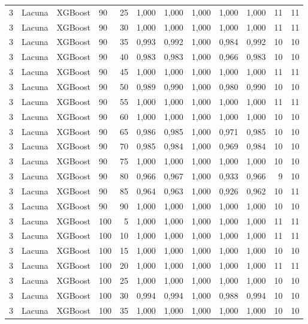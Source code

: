 \begin{longtable}{ccclrrrrrrrr}
3 & Lacuna & XGBoost & 90 & 25 & 1,000 & 1,000 & 1,000 & 1,000 & 1,000 & 11 & 11 \\
3 & Lacuna & XGBoost & 90 & 30 & 1,000 & 1,000 & 1,000 & 1,000 & 1,000 & 11 & 11 \\
3 & Lacuna & XGBoost & 90 & 35 & 0,993 & 0,992 & 1,000 & 0,984 & 0,992 & 10 & 10 \\
3 & Lacuna & XGBoost & 90 & 40 & 0,983 & 0,983 & 1,000 & 0,966 & 0,983 & 10 & 10 \\
3 & Lacuna & XGBoost & 90 & 45 & 1,000 & 1,000 & 1,000 & 1,000 & 1,000 & 11 & 11 \\
3 & Lacuna & XGBoost & 90 & 50 & 0,989 & 0,990 & 1,000 & 0,980 & 0,990 & 10 & 10 \\
3 & Lacuna & XGBoost & 90 & 55 & 1,000 & 1,000 & 1,000 & 1,000 & 1,000 & 11 & 11 \\
3 & Lacuna & XGBoost & 90 & 60 & 1,000 & 1,000 & 1,000 & 1,000 & 1,000 & 10 & 10 \\
3 & Lacuna & XGBoost & 90 & 65 & 0,986 & 0,985 & 1,000 & 0,971 & 0,985 & 10 & 10 \\
3 & Lacuna & XGBoost & 90 & 70 & 0,985 & 0,984 & 1,000 & 0,969 & 0,984 & 10 & 10 \\
3 & Lacuna & XGBoost & 90 & 75 & 1,000 & 1,000 & 1,000 & 1,000 & 1,000 & 10 & 10 \\
3 & Lacuna & XGBoost & 90 & 80 & 0,966 & 0,967 & 1,000 & 0,933 & 0,966 & 9 & 10 \\
3 & Lacuna & XGBoost & 90 & 85 & 0,964 & 0,963 & 1,000 & 0,926 & 0,962 & 10 & 11 \\
3 & Lacuna & XGBoost & 90 & 90 & 1,000 & 1,000 & 1,000 & 1,000 & 1,000 & 10 & 10 \\
3 & Lacuna & XGBoost & 100 & 5 & 1,000 & 1,000 & 1,000 & 1,000 & 1,000 & 11 & 11 \\
3 & Lacuna & XGBoost & 100 & 10 & 1,000 & 1,000 & 1,000 & 1,000 & 1,000 & 11 & 11 \\
3 & Lacuna & XGBoost & 100 & 15 & 1,000 & 1,000 & 1,000 & 1,000 & 1,000 & 10 & 10 \\
3 & Lacuna & XGBoost & 100 & 20 & 1,000 & 1,000 & 1,000 & 1,000 & 1,000 & 11 & 11 \\
3 & Lacuna & XGBoost & 100 & 25 & 1,000 & 1,000 & 1,000 & 1,000 & 1,000 & 10 & 10 \\
3 & Lacuna & XGBoost & 100 & 30 & 0,994 & 0,994 & 1,000 & 0,988 & 0,994 & 10 & 10 \\
3 & Lacuna & XGBoost & 100 & 35 & 1,000 & 1,000 & 1,000 & 1,000 & 1,000 & 10 & 10 \\

\end{longtable}
